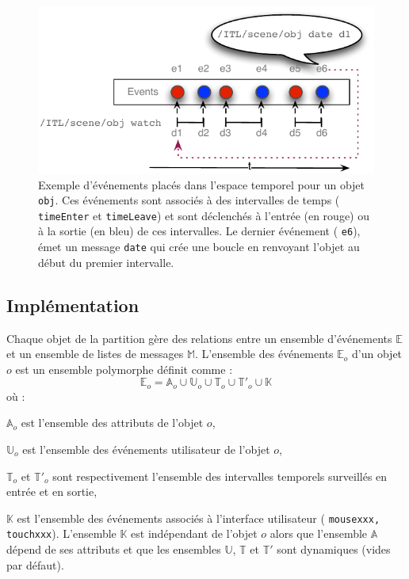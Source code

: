 \documentclass{article}
\newcommand{\OSC}[1]	{{\fontsize{9pt}{9pt} \selectfont\texttt{#1}}}
\let\olditemize\itemize
\let\oldenditemize\enditemize
\renewenvironment{itemize} 	{\olditemize \renewcommand{\labelitemi}{$\bullet$} \setlength{\itemsep}{0mm}}{\oldenditemize}
\begin{document}
\begin{figure}[h]
   \centering
   \includegraphics[width=0.95\columnwidth]{imgs/events}
   \caption{Exemple d'événements placés dans l'espace temporel pour un objet \OSC{obj}. Ces événements sont associés à des intervalles de temps (\OSC{timeEnter} et \OSC{timeLeave}) et sont déclenchés à l'entrée (en rouge) ou à la sortie (en bleu) de ces intervalles. Le dernier événement (\OSC{e6}), émet un message \OSC{date} qui crée une boucle en renvoyant l'objet au début du premier intervalle.}
   \label{fig:events}
\end{figure}

\subsection{Implémentation}

Chaque objet de la partition gère des relations entre un ensemble d'événements $\mathbb{E}$ et un ensemble de listes de messages $\mathbb{M}$. L'ensemble des événements $\mathbb{E}_o$ d'un objet $o$ est un ensemble polymorphe définit comme : 
\[
	\mathbb{E}_o = \mathbb{A}_o \cup \mathbb{U}_o \cup \mathbb{T}_o \cup \mathbb{T'}_o \cup \mathbb{K}  
\] 
où :
\begin{itemize}
\item[-] $\mathbb{A}_o$ est l'ensemble des attributs de l'objet $o$, 
\item[-] $\mathbb{U}_o$ est l'ensemble des événements utilisateur de l'objet $o$, 
\item[-] $\mathbb{T}_o$ et $\mathbb{T'}_o$ sont respectivement l'ensemble des intervalles temporels surveillés en entrée et en sortie,
\item[-] $\mathbb{K}$ est l'ensemble des événements associés à l'interface utilisateur (\OSC{mousexxx, touchxxx}).
\end{itemize}
L'ensemble $\mathbb{K}$ est indépendant de l'objet $o$ alors que l'ensemble $\mathbb{A}$ dépend de ses attributs et que les ensembles $\mathbb{U}$, $\mathbb{T}$ et $\mathbb{T'}$ sont dynamiques (vides par défaut).
\end{document}
